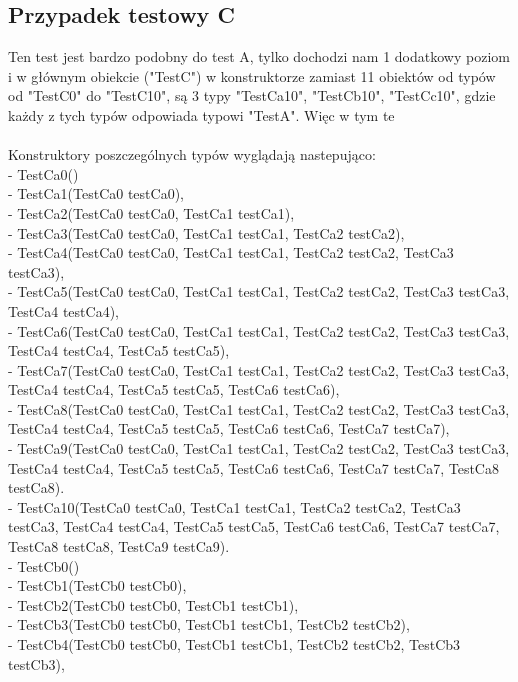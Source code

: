 \documentclass[12pt]{article}
\begin{document}
\subsection{Przypadek testowy C}
Ten test jest bardzo podobny do test A, tylko dochodzi nam 1 dodatkowy poziom i w głównym obiekcie ("TestC") w konstruktorze zamiast 11 obiektów od typów od "TestC0" do "TestC10", są 3 typy "TestCa10", "TestCb10", "TestCc10", gdzie każdy z tych typów odpowiada typowi "TestA". Więc w tym te\\
\\
Konstruktory poszczególnych typów wyglądają nastepująco:\\
- TestCa0()\\
- TestCa1(TestCa0 testCa0),\\
- TestCa2(TestCa0 testCa0, TestCa1 testCa1),\\
- TestCa3(TestCa0 testCa0, TestCa1 testCa1, TestCa2 testCa2),\\
- TestCa4(TestCa0 testCa0, TestCa1 testCa1, TestCa2 testCa2, TestCa3 testCa3),\\
- TestCa5(TestCa0 testCa0, TestCa1 testCa1, TestCa2 testCa2, TestCa3 testCa3, TestCa4 testCa4),\\
- TestCa6(TestCa0 testCa0, TestCa1 testCa1, TestCa2 testCa2, TestCa3 testCa3, TestCa4 testCa4, TestCa5 testCa5),\\
- TestCa7(TestCa0 testCa0, TestCa1 testCa1, TestCa2 testCa2, TestCa3 testCa3, TestCa4 testCa4, TestCa5 testCa5, TestCa6 testCa6),\\
- TestCa8(TestCa0 testCa0, TestCa1 testCa1, TestCa2 testCa2, TestCa3 testCa3, TestCa4 testCa4, TestCa5 testCa5, TestCa6 testCa6, TestCa7 testCa7),\\
- TestCa9(TestCa0 testCa0, TestCa1 testCa1, TestCa2 testCa2, TestCa3 testCa3, TestCa4 testCa4, TestCa5 testCa5, TestCa6 testCa6, TestCa7 testCa7, TestCa8 testCa8).\\
- TestCa10(TestCa0 testCa0, TestCa1 testCa1, TestCa2 testCa2, TestCa3 testCa3, TestCa4 testCa4, TestCa5 testCa5, TestCa6 testCa6, TestCa7 testCa7, TestCa8 testCa8, TestCa9 testCa9).\\
- TestCb0()\\
- TestCb1(TestCb0 testCb0),\\
- TestCb2(TestCb0 testCb0, TestCb1 testCb1),\\
- TestCb3(TestCb0 testCb0, TestCb1 testCb1, TestCb2 testCb2),\\
- TestCb4(TestCb0 testCb0, TestCb1 testCb1, TestCb2 testCb2, TestCb3 testCb3),\\
\end{document}

